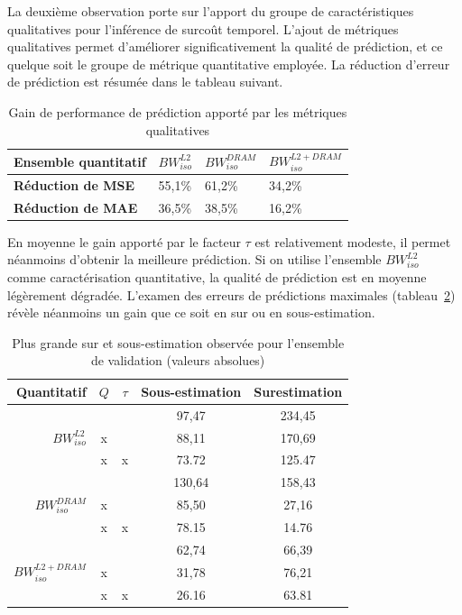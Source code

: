 La deuxième observation porte sur l'apport du groupe de caractéristiques qualitatives pour l'inférence de surcoût temporel.
L'ajout de métriques qualitatives permet d'améliorer significativement la qualité de prédiction, et ce quelque soit le groupe de métrique quantitative employée. La réduction d'erreur de prédiction est résumée dans le tableau suivant.

\begin{table}[h!]
\centering
\renewcommand{\arraystretch}{1.3}
\begin{tabular}{l l l l}
	\toprule
\textbf{Ensemble quantitatif}	& $BW_{iso}^{L2}$ & $BW_{iso}^{DRAM}$ & $BW_{iso}^{L2 + DRAM}$ \\
	\midrule
\textbf{Réduction de MSE}		&      	  55,1\%  &       	   61,2\% &       			34,2\% \\
\textbf{Réduction de MAE}		&       36,5\%      &       38,5\% 	  &         16,2\%            \\
	\bottomrule
\end{tabular}
\caption{\label{table:gain-qualitatif}Gain de performance de prédiction apporté par les métriques qualitatives}
\end{table}

En moyenne le gain apporté par le facteur $\tau$ est relativement modeste, il permet néanmoins d'obtenir la meilleure prédiction.
Si on utilise l'ensemble $BW_{iso}^{L2}$ comme caractérisation quantitative, la qualité de prédiction est en moyenne légèrement dégradée.
L'examen des erreurs de prédictions maximales (tableau~\ref{table:max-error}) révèle néanmoins un gain que ce soit en sur ou en sous-estimation.


\begin{table}
	\centering
	\renewcommand{\arraystretch}{1.3}
	\begin{tabular}{r c c c c}
	\toprule
	Quantitatif  & $Q$ & $\tau$ & Sous-estimation & Surestimation \\
	\midrule
\multirow{3}{*}{$BW_{iso}^{L2}$} 	   	&   &    & 97,47 & 234,45 \\
										& x &    & 88,11 & 170,69 \\
 										& x & x  & 73.72 & 125.47 \\
\midrule
\multirow{3}{*}{$BW_{iso}^{DRAM}$} 	   	&   &    & 130,64 & 158,43 \\
     								   	& x &    & 85,50  & 27,16 \\
   									   	& x & x  & 78.15  & 14.76 \\
\midrule
\multirow{3}{*}{$BW_{iso}^{L2 + DRAM}$} &   &    & 62,74 & 66,39 \\
 										& x &    & 31,78 & 76,21 \\
										& x & x  & 26.16 & 63.81 \\
\bottomrule
	\end{tabular}
	\caption{\label{table:max-error}Plus grande sur et sous-estimation observée pour l'ensemble de validation (valeurs absolues)}
\end{table}

